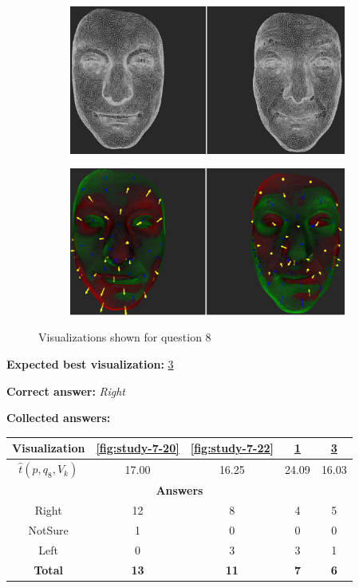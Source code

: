 \begin{figure}[h]
\begin{subfigure}{0.4\textwidth}
\includegraphics[width=\textwidth]{./screenshots/pair19.PNG}
\caption{}
\label{fig:study-7-19}
\end{subfigure}
\quad
\begin{subfigure}{0.4\textwidth}
\includegraphics[width=\textwidth]{./screenshots/pair21.PNG}
\caption{}
\label{fig:study-7-21}
\end{subfigure}
\caption{Visualizations shown for question 8}
\end{figure}
\medskip

{\bf Expected best visualization:} \ref{fig:study-7-21}
\medskip

{\bf Correct answer:} {\it Right}
\medskip

{\bf Collected answers:}

\begin{center}
\begin{tabular}{| c | c | c | c | c |}
	\hline
	Visualization & \ref{fig:study-7-20} & \ref{fig:study-7-22} & \ref{fig:study-7-19} & \ref{fig:study-7-21}\\ \hline
	\(\widehat{t}(p, q_8, V_k)\) & 17.00 & 16.25 & 24.09 & 16.03\\ \hline
	\multicolumn{5}{|c|}{\bf Answers} \\ \hline
	\rowcolor{yellow!30} Right & 12 & 8 & 4 & 5\\ \hline
	NotSure & 1 & 0 & 0 & 0\\ \hline
	Left & 0 & 3 & 3 & 1\\ \hline
	{\bf Total} & {\bf 13} & {\bf 11} & {\bf 7} & {\bf 6}\\ \hline
\end{tabular}
\end{center}
\clearpage

